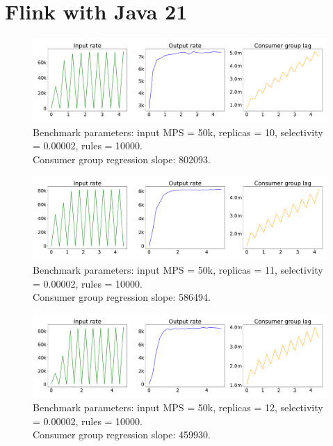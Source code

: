\newpage

\section{Flink with Java 21}\label{sec:flink-on-java-21}

\begin{figure}[H]
    \centering
    \includegraphics[width=1\textwidth]{figures/flink-java-21-replicas-10}
    \caption{Benchmark parameters: input MPS = 50k, replicas = 10, selectivity = 0.00002, rules = 10000. \\
    Consumer group regression slope: 802093.}
    \label{fig:flink-java-21-replicas-10}
\end{figure}


\begin{figure}[H]
    \centering
    \includegraphics[width=1\textwidth]{figures/flink-java-21-replicas-11}
    \caption{Benchmark parameters: input MPS = 50k, replicas = 11, selectivity = 0.00002, rules = 10000. \\
    Consumer group regression slope: 586494.}
    \label{fig:flink-java-21-replicas-11}
\end{figure}

\begin{figure}[H]
    \centering
    \includegraphics[width=1\textwidth]{figures/flink-java-21-replicas-12}
    \caption{Benchmark parameters: input MPS = 50k, replicas = 12, selectivity = 0.00002, rules = 10000. \\
    Consumer group regression slope: 459930.}
    \label{fig:flink-java-21-replicas-12}
\end{figure}



